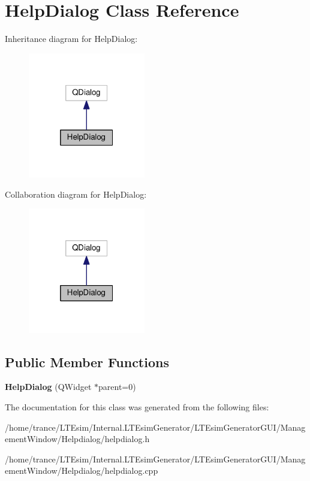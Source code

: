 \hypertarget{class_help_dialog}{}\section{Help\+Dialog Class Reference}
\label{class_help_dialog}


Inheritance diagram for Help\+Dialog\+:
\nopagebreak
\begin{figure}[H]
\begin{center}
\leavevmode
\includegraphics[width=145pt]{class_help_dialog__inherit__graph}
\end{center}
\end{figure}


Collaboration diagram for Help\+Dialog\+:
\nopagebreak
\begin{figure}[H]
\begin{center}
\leavevmode
\includegraphics[width=145pt]{class_help_dialog__coll__graph}
\end{center}
\end{figure}
\subsection*{Public Member Functions}
\begin{DoxyCompactItemize}
\item 
{\bfseries Help\+Dialog} (Q\+Widget $\ast$parent=0)\hypertarget{class_help_dialog_ab2cdaaff98141da0157b317e8a233e0f}{}\label{class_help_dialog_ab2cdaaff98141da0157b317e8a233e0f}

\end{DoxyCompactItemize}


The documentation for this class was generated from the following files\+:\begin{DoxyCompactItemize}
\item 
/home/trance/\+L\+T\+Esim/\+Internal.\+L\+T\+Esim\+Generator/\+L\+T\+Esim\+Generator\+G\+U\+I/\+Management\+Window/\+Helpdialog/helpdialog.\+h\item 
/home/trance/\+L\+T\+Esim/\+Internal.\+L\+T\+Esim\+Generator/\+L\+T\+Esim\+Generator\+G\+U\+I/\+Management\+Window/\+Helpdialog/helpdialog.\+cpp\end{DoxyCompactItemize}
